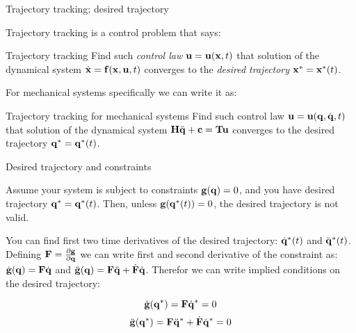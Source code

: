 \documentclass{beamer}
\begin{document}
\begin{frame}{Trajectory tracking; desired trajectory}
\begin{flushleft}

Trajectory tracking is a control problem that says:

\begin{block}{Trajectory tracking}
Find such \emph{control law} $\mathbf{u} = \mathbf{u}(\mathbf{x}, t)$ that solution of the dynamical system $\dot{\mathbf{x}} = \mathbf{f}(\mathbf{x}, \mathbf{u}, t)$ converges to the \emph{desired trajectory} $\mathbf{x}^* = \mathbf{x}^*(t)$.
\end{block}

For mechanical systems specifically we can write it as:

\begin{block}{Trajectory tracking for mechanical systems}
Find such control law $\mathbf{u} = \mathbf{u}(\mathbf{q}, \dot{\mathbf{q}}, t)$ that solution of the dynamical system $\mathbf{H} \ddot{\mathbf{q}} + \mathbf{c} = \mathbf{T}\mathbf{u}$ converges to the desired trajectory $\mathbf{q}^* = \mathbf{q}^*(t)$.
\end{block}

\end{flushleft}
\end{frame}



\begin{frame}{Desired trajectory and constraints}
\begin{flushleft}

Assume your system is subject to constraints $\mathbf{g}(\mathbf{q}) = 0$, and you have desired trajectory $\mathbf{q}^* = \mathbf{q}^*(t)$. Then, unless $\mathbf{g}(\mathbf{q}^*(t)) = 0$, the desired trajectory is not valid.

\bigskip

You can find first two time derivatives of the desired trajectory: $\dot{\mathbf{q}}^*(t)$ and $\ddot{\mathbf{q}}^*(t)$. Defining $\mathbf{F} = \frac{\partial \mathbf{g}}{\partial \mathbf{q}}$ we can write first and second derivative of the constraint as: $\dot{\mathbf{g}}(\mathbf{q}) = \mathbf{F}\dot{\mathbf{q}}$ and $\ddot{\mathbf{g}}(\mathbf{q}) = \mathbf{F}\ddot{\mathbf{q}} + \dot{\mathbf{F}}\dot{\mathbf{q}}$. Therefor we can write implied conditions on the desired trajectory:

\begin{equation}
    \dot{\mathbf{g}}(\mathbf{q}^*) = \mathbf{F}\dot{\mathbf{q}}^* = 0
\end{equation}
\begin{equation}
    \ddot{\mathbf{g}}(\mathbf{q}^*) = \mathbf{F}\ddot{\mathbf{q}}^* + \dot{\mathbf{F}}\dot{\mathbf{q}}^* = 0
\end{equation}

\end{flushleft}
\end{frame}
\end{document}

